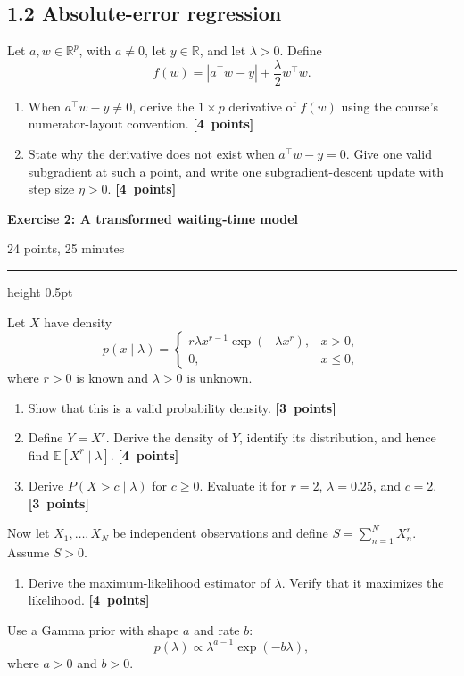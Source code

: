\documentclass[11pt,a4paper]{article}
\newcommand{\points}[1]{\unskip\nobreak\hfill\mbox{\textbf{[#1 points]}}}
\newcommand{\exercise}[3]{%
  \Needspace{8\baselineskip}%
  \par\addvspace{1.1em}%
  \noindent
  \begin{minipage}[t]{0.73\textwidth}
    \vspace{0pt}\raggedright\large\bfseries\color{examblue}
    Exercise #1: #2
  \end{minipage}\hfill
  \begin{minipage}[t]{0.24\textwidth}
    \vspace{0pt}\raggedleft\small\color{examblue}#3
  \end{minipage}%
  \par\nobreak\vspace{0.2em}%
  {\color{rulegray}\hrule height 0.5pt}%
  \vspace{0.55em}%
}
\begin{document}
\subsection*{1.2 Absolute-error regression}

Let $a,w\in\mathbb{R}^p$, with $a\neq 0$, let $y\in\mathbb{R}$, and let $\lambda>0$. Define
\[
  f(w)=|a^\top w-y|+\frac{\lambda}{2}w^\top w.
\]

\begin{enumerate}[resume]
  \item When $a^\top w-y\neq 0$, derive the $1\times p$ derivative of $f(w)$ using the course's numerator-layout convention. \points{4}
  \item State why the derivative does not exist when $a^\top w-y=0$. Give one valid subgradient at such a point, and write one subgradient-descent update with step size $\eta>0$. \points{4}
\end{enumerate}

\exercise{2}{A transformed waiting-time model}{24 points, 25 minutes}

Let $X$ have density
\[
  p(x\mid\lambda)=
  \begin{cases}
    r\lambda x^{r-1}\exp(-\lambda x^r), & x>0,\\
    0, & x\leq 0,
  \end{cases}
\]
where $r>0$ is known and $\lambda>0$ is unknown.

\begin{enumerate}
  \item Show that this is a valid probability density. \points{3}
  \item Define $Y=X^r$. Derive the density of $Y$, identify its distribution, and hence find $\mathbb{E}[X^r\mid\lambda]$. \points{4}
  \item Derive $P(X>c\mid\lambda)$ for $c\geq 0$. Evaluate it for $r=2$, $\lambda=0.25$, and $c=2$. \points{3}
\end{enumerate}

Now let $X_1,\ldots,X_N$ be independent observations and define $S=\sum_{n=1}^{N}X_n^r$. Assume $S>0$.

\begin{enumerate}[resume]
  \item Derive the maximum-likelihood estimator of $\lambda$. Verify that it maximizes the likelihood. \points{4}
\end{enumerate}

Use a Gamma prior with shape $a$ and rate $b$:
\[
  p(\lambda)\propto\lambda^{a-1}\exp(-b\lambda),
\]
where $a>0$ and $b>0$.
\end{document}
